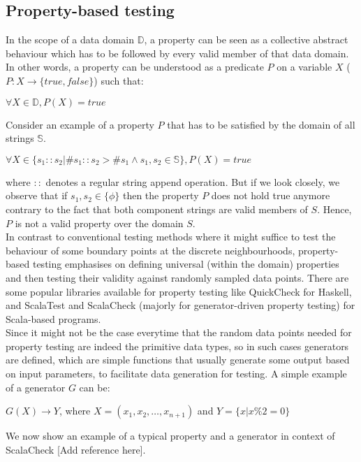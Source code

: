 
\newcommand{\avector}[2]{(#1_1,#1_2,\ldots,#1_{#2})}
\newcommand{\aDEFvector}[2][a]{(#1_1,#1_2,\ldots,#1_{#2})}

\subsection{Property-based testing}
In the scope of a data domain $\mathbb{D}$, a property can be seen as a collective abstract behaviour which has to be followed by every valid member of that data domain. In other words, a property can be understood as a predicate $P$ on a variable $X$ ($P:X \rightarrow \{true, false\}$) such that: 
\begin{center}
$\forall X \in \mathbb{D}, P(X) = true$
\end{center}
Consider an example of a property $P$ that has to be satisfied by the domain of all strings $\mathbb{S}$.
\begin{center}
$\forall X \in \{s_1::s_2 | \#s_1::s_2 >  \#s_1 \wedge s_1, s_2 \in \mathbb{S}\}, P(X) = true$
\end{center}
where $::$ denotes a regular string append operation. But if we look closely, we observe that if $s_1, s_2 \in \{\phi\}$ then the property $P$ does not hold true anymore contrary to the fact that both component strings are valid members of $S$. Hence, $P$ is not a valid property over the domain $S$. \\
In contrast to conventional testing methods where it might suffice to test the behaviour of some boundary points at the discrete neighbourhoods, property-based testing emphasises on defining universal (within the domain) properties and then testing their validity against randomly sampled data points. There are some popular libraries available for property testing like QuickCheck for Haskell,  and ScalaTest and ScalaCheck (majorly for generator-driven property testing) for Scala-based programs. \\
Since it might not be the case everytime that the random data points needed for property testing are indeed the primitive data types, so in such cases generators are defined, which are simple functions that usually generate some output based on input parameters, to facilitate data generation for testing. A simple example of a generator $G$ can be:
\begin{center}
$G(X) \rightarrow {Y}$, where $X=\aDEFvector[x]{n+1}$ and $Y=\{x | x \% 2 = 0\}$
\end{center}
We now show an example of a typical property and a generator in context of ScalaCheck [Add reference here]. 